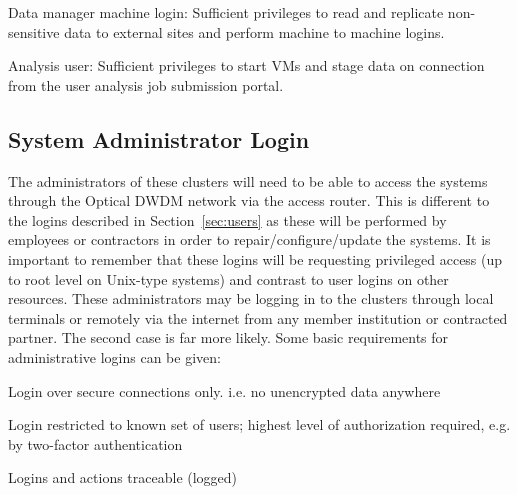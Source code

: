 \documentclass[12pt,a4paper]{article}
\begin{document}
\item Data manager machine login: Sufficient privileges to read and replicate non-sensitive data to external sites and perform machine to machine logins.


\item Analysis user: Sufficient privileges to start VMs and stage data on connection from the user analysis job submission portal.
 
\eitm

\subsection{System Administrator Login}
\label{sec:admin}


The administrators of these clusters will need to be able to access the \ED systems through the Optical DWDM network via the access router.
This is different to the logins described in Section~\ref{sec:users} as these will be performed by \EC employees or contractors
in order to repair/configure/update the systems.
It is important to remember that these logins will be requesting privileged access (up to root level on Unix-type systems) and contrast to user logins on other \einfra resources.
These administrators may be logging in to the clusters through local terminals or remotely via the internet from any \EC member institution
or contracted partner.
The second case is far more likely.
Some basic requirements for administrative logins can be given:
\bitm
\item Login over secure connections only. i.e. no unencrypted data anywhere

\item Login restricted to known set of users; highest level of authorization required, e.g. by two-factor authentication~\cite{two-factor}

\item Logins and actions traceable (logged)
\eitm

\end{document}
